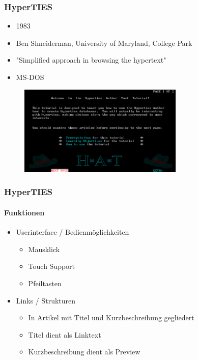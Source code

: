\begin{frame}
\frametitle{HyperTIES}
\begin{itemize}
	\item 1983
	\item Ben Shneiderman, University of Maryland, College Park
	\item "Simplified approach in browsing the hypertext"
	\item MS-DOS
\end{itemize}

\begin{figure}[htbp]
	\centering
	\includegraphics[width=0.7\textwidth]{images/hyperties}
\end{figure}

\end{frame}

\begin{frame}
\frametitle{HyperTIES}
\framesubtitle{Funktionen}
	\begin{itemize}
		\item Userinterface / Bedienmöglichkeiten
		\begin{itemize}
			\item Mausklick
			\item Touch Support 
			\item Pfeiltasten
		\end{itemize}
		\item Links / Strukturen
		\begin{itemize}
			\item In Artikel mit Titel und Kurzbeschreibung gegliedert
			\item Titel dient als Linktext
			\item Kurzbeschreibung dient als Preview
		\end{itemize}
	\end{itemize}
\end{frame}